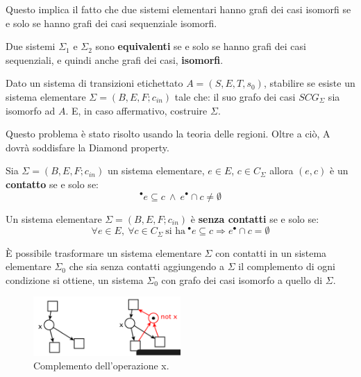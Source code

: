 Questo implica il fatto che due sistemi elementari hanno grafi dei casi isomorfi
se e solo se hanno grafi dei casi sequenziale isomorfi.
\begin{definizione}
    Due sistemi $\Sigma_1$ e $\Sigma_2$ sono \textbf{equivalenti} se e solo se
    hanno grafi dei casi sequenziali, e quindi anche grafi dei casi, \textbf{isomorfi}.
\end{definizione}
\begin{definizione}
    Dato un sistema di transizioni etichettato $A = (S, E,T,s_0)$, stabilire se
    esiste un sistema elementare $\Sigma = (B, E, F; c_{in})$ tale che: il suo
    grafo dei casi $SCG_{\Sigma}$ sia isomorfo ad $A$. E, in caso affermativo,
    costruire $\Sigma$.

    Questo problema è stato risolto usando la teoria delle regioni. Oltre a ciò,
    A dovrà soddisfare la Diamond property.
\end{definizione}
\begin{definizione}
    Sia $\Sigma = (B, E, F; c_{in})$ un sistema elementare, $e \in E$, $c \in
        C_{\Sigma}$ allora $(e, c)$ è un \textbf{contatto} se e solo se:
    \begin{equation}
        ^{\bullet}e \subseteq c \ \land \ e^{\bullet} \cap c \neq \emptyset
    \end{equation}
\end{definizione}
\begin{definizione}
    Un sistema elementare $\Sigma = (B, E, F; c_{in})$ è \textbf{senza contatti}
    se e solo se:
    \begin{equation}
        \forall e \in E, \ \forall c \in C_{\Sigma} \ \text{si ha} \ ^{\bullet}e
        \subseteq c \Rightarrow e^{\bullet} \cap c = \emptyset
    \end{equation}
\end{definizione}
È possibile trasformare un sistema elementare $\Sigma$ con contatti in un
sistema elementare $\Sigma_0$ che sia senza contatti aggiungendo a $\Sigma$ il
complemento di ogni condizione si ottiene, un sistema $\Sigma_0$ con grafo dei
casi isomorfo a quello di $\Sigma$.
\begin{figure}[!ht]
    \centering
    \includegraphics[width=0.5\textwidth]{img/reti/DelContatti.png}
    \caption{Complemento dell'operazione x.}
\end{figure}
